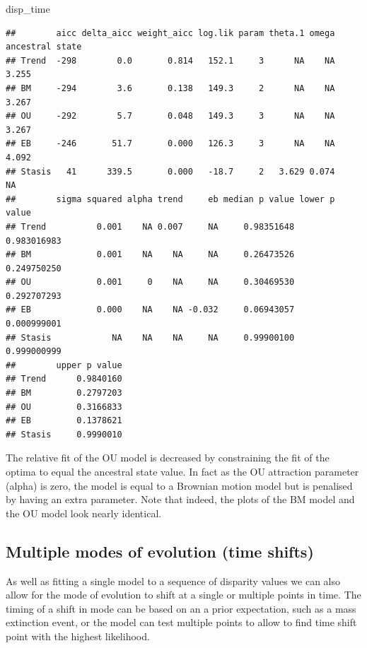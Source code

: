 \documentclass[]{book}
\newenvironment{Shaded}{\begin{snugshade}}{\end{snugshade}}
\newcommand{\NormalTok}[1]{#1}
\begin{document}
\begin{Shaded}
\begin{Highlighting}[]
\NormalTok{disp_time}
\end{Highlighting}
\end{Shaded}

\begin{verbatim}
##        aicc delta_aicc weight_aicc log.lik param theta.1 omega ancestral state
## Trend  -298        0.0       0.814   152.1     3      NA    NA           3.255
## BM     -294        3.6       0.138   149.3     2      NA    NA           3.267
## OU     -292        5.7       0.048   149.3     3      NA    NA           3.267
## EB     -246       51.7       0.000   126.3     3      NA    NA           4.092
## Stasis   41      339.5       0.000   -18.7     2   3.629 0.074              NA
##        sigma squared alpha trend     eb median p value lower p value
## Trend          0.001    NA 0.007     NA     0.98351648   0.983016983
## BM             0.001    NA    NA     NA     0.26473526   0.249750250
## OU             0.001     0    NA     NA     0.30469530   0.292707293
## EB             0.000    NA    NA -0.032     0.06943057   0.000999001
## Stasis            NA    NA    NA     NA     0.99900100   0.999000999
##        upper p value
## Trend      0.9840160
## BM         0.2797203
## OU         0.3166833
## EB         0.1378621
## Stasis     0.9990010
\end{verbatim}

The relative fit of the OU model is decreased by constraining the fit of the optima to equal the ancestral state value.
In fact as the OU attraction parameter (alpha) is zero, the model is equal to a Brownian motion model but is penalised by having an extra parameter.
Note that indeed, the plots of the BM model and the OU model look nearly identical.

\hypertarget{multiple-modes-of-evolution-time-shifts}{%
\subsection{Multiple modes of evolution (time shifts)}\label{multiple-modes-of-evolution-time-shifts}}

As well as fitting a single model to a sequence of disparity values we can also allow for the mode of evolution to shift at a single or multiple points in time.
The timing of a shift in mode can be based on an a prior expectation, such as a mass extinction event, or the model can test multiple points to allow to find time shift point with the highest likelihood.
\end{document}

